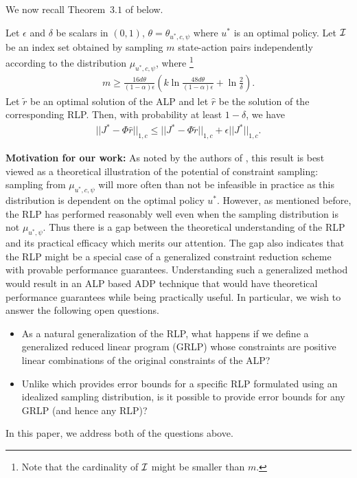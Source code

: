 We now recall Theorem~$3.1$ of \cite{CS} below. 
\begin{theorem}\label{csresult}
Let $\epsilon$ and $\delta$ be scalars in $(0,1)$,
$\theta = \theta_{u^*,c,\psi}$ where $u^*$ is an optimal policy.
Let $\mathcal{I}$ be an index set obtained by sampling $m$ state-action pairs 
	independently according to the distribution $\mu_{u^*,c,\psi}$,
	where%
	\footnote{Note that the cardinality of $\mathcal{I}$ might be smaller than $m$.}
\begin{align}
m\geq \frac{16d\theta}{(1-\alpha)\epsilon}\left(k\ln\frac{48d\theta}{(1-\alpha)\epsilon}+\ln\frac{2}{\delta}\right).
\end{align}
Let $\tilde{r}$ be an optimal	solution of the ALP and let $\hat{r}$ be the solution of the corresponding RLP. 
Then, with probability at least $1-\delta$, we have
\begin{align}
||J^*-\Phi \hat{r}||_{1,c}\leq ||J^*-\Phi \tilde{r}||_{1,c}+\epsilon||J^*||_{1,c}.
\end{align}
\end{theorem}
\noindent \textbf{Motivation for our work:}
As noted by the authors of \cite{CS}, this result is best viewed as a
	theoretical illustration of the potential of constraint sampling:
	sampling from $\mu_{u^*,c,\psi}$ will more often than not be infeasible in practice
	as this distribution is dependent on the optimal policy $u^*$.
However, as mentioned before, the RLP has performed reasonably well 
	even when the sampling distribution is not $\mu_{u^*,\psi}$. 
Thus there is a gap between the theoretical understanding of the RLP 
	and its practical efficacy which merits our attention. 
The gap also indicates that the RLP might be a special case 
	of a generalized constraint reduction scheme with provable performance guarantees. 
Understanding such a generalized method would result in an ALP based ADP technique 
	that would have theoretical performance guarantees while being practically useful. 
In particular, we wish to answer the following open questions.
\begin{itemize}
\item  As a natural generalization of the RLP, what happens if we define a generalized reduced linear program (GRLP) whose constraints are positive linear combinations of the original constraints of the ALP?
\item Unlike \cite{CS} which provides error bounds for a specific RLP formulated using an idealized sampling distribution, is it possible to provide error bounds for any GRLP (and hence any RLP)?
\end{itemize}
In this paper, we address both of the questions above.
